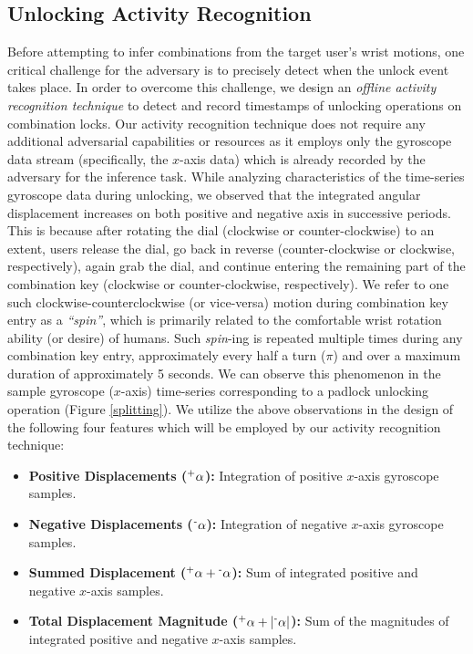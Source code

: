 \documentclass[]{IEEEtran}
\begin{document}
\subsection{Unlocking Activity Recognition}
\label{activityrecognition}
Before attempting to infer combinations from the target user's wrist motions, one critical challenge for the adversary is to precisely detect when the unlock event takes place. In order to overcome this challenge, we design an \emph{offline activity recognition technique} to detect and record timestamps of unlocking operations on combination locks. Our activity recognition technique does not require any additional adversarial capabilities or resources as it employs only the gyroscope data stream (specifically, the $x$-axis data) which is already recorded by the adversary for the inference task. While analyzing characteristics of the time-series gyroscope data during unlocking, we observed that the integrated angular displacement increases on both positive and negative axis in successive periods. This is because after rotating the dial (clockwise or counter-clockwise) to an extent, users release the dial, go back in reverse (counter-clockwise or clockwise, respectively), again grab the dial, and continue entering the remaining part of the combination key (clockwise or counter-clockwise, respectively). We refer to one such clockwise-counterclockwise (or vice-versa) motion during combination key entry as a \textit{``spin''}, which is primarily related to the comfortable wrist rotation ability (or desire) of humans. Such \textit{spin}-ing is repeated multiple times during any combination key entry, approximately every half a turn ($\pi$) and over a maximum duration of approximately 5 seconds. We can observe this phenomenon in the sample gyroscope ($x$-axis) time-series corresponding to a padlock unlocking operation (Figure \ref{splitting}). We utilize the above observations in the design of the following four features which will be employed by our activity recognition technique:

\begin{itemize}[leftmargin=*]
\item \textbf{Positive Displacements ($\textsuperscript{+}\alpha$):} Integration of positive $x$-axis gyroscope samples.
\item \textbf{Negative Displacements ($\textsuperscript{-}\alpha$):} Integration of negative $x$-axis gyroscope samples.
\item \textbf{Summed Displacement ($\textsuperscript{+}\alpha + \textsuperscript{-}\alpha$):} Sum of integrated positive and negative $x$-axis samples.
\item \textbf{Total Displacement Magnitude ($\textsuperscript{+}\alpha + |\textsuperscript{-}\alpha|$):} Sum of the magnitudes of integrated positive and negative $x$-axis samples.
\end{itemize}
\end{document}
